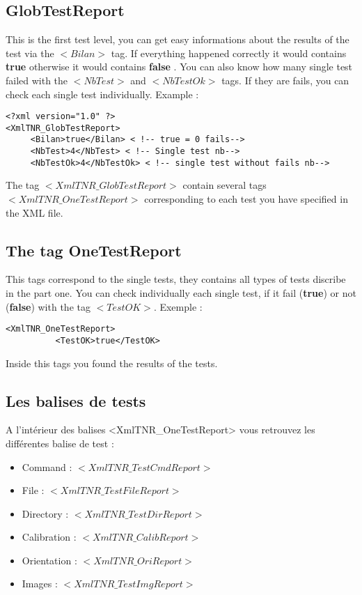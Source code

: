 \documentclass[a4paper]{book}
\begin{document}
\subsection{GlobTestReport}
This is the first test level, you can get easy informations about the results of the test via the $<Bilan>$ tag. If everything happened correctly it would contains \textbf{true} otherwise it would contains \textbf{false} .
You can also know how many single test failed with the $<NbTest>$ and $<NbTestOk>$ tags. If they are fails, you can check each single test individually.
Example :
\begin{lstlisting}
<?xml version="1.0" ?>
<XmlTNR_GlobTestReport>
     <Bilan>true</Bilan> < !-- true = 0 fails-->
     <NbTest>4</NbTest> < !-- Single test nb-->
     <NbTestOk>4</NbTestOk> < !-- single test without fails nb-->
\end{lstlisting}

The tag $<XmlTNR\_GlobTestReport>$ contain several tags $<XmlTNR\_OneTestReport>$ corresponding to each test you have specified in the XML file.
 
\subsection{The tag OneTestReport}
This tags correspond to the single tests, they contains all types of tests discribe in the part one. You can check individually each single test, if it fail (\textbf{true}) or not (\textbf{false}) with the tag $<TestOK>$.
Exemple :
\begin{lstlisting}
<XmlTNR_OneTestReport>
          <TestOK>true</TestOK>
\end{lstlisting}
Inside this tags you found the results of the tests.

\subsection{Les balises de tests}
A l’int\'erieur des balises <XmlTNR\_OneTestReport> vous retrouvez les diff\'erentes balise de test :
\begin{itemize}
\item Command : $<XmlTNR\_TestCmdReport>$
\item File : $<XmlTNR\_TestFileReport>$
\item Directory : $<XmlTNR\_TestDirReport>$
\item Calibration : $<XmlTNR\_CalibReport>$
\item Orientation : $<XmlTNR\_OriReport>$
\item Images : $<XmlTNR\_TestImgReport>$
\end{itemize}
\end{document}

